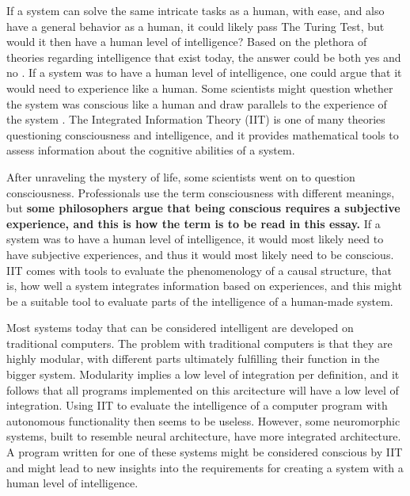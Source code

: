 If a system can solve the same intricate tasks as a human, with ease, and also have a general behavior as a human,
it could likely pass The Turing Test, but would it then have a human level of intelligence?
Based on the plethora of theories regarding intelligence that exist today, the answer could be both yes and no \cite{haenlein_brief_2019}.
If a system was to have a human level of intelligence, one could argue that it would need to experience like a human.
Some scientists might question whether the system was conscious like a human and draw parallels to the experience of the system \cite{tononi_integrated_2016}.
The Integrated Information Theory (IIT) is one of many theories questioning consciousness and intelligence, and it provides mathematical tools
to assess information about the cognitive abilities of a system.

After unraveling the mystery of life, some scientists went on to question consciousness.
Professionals use the term consciousness with different meanings, but \textbf{some philosophers argue that being conscious requires a subjective experience, and this is how the term is to be read in this essay.}
If a system was to have a human level of intelligence, it would most likely need to have subjective experiences, and thus it would most likely need to be conscious.
IIT comes with tools to evaluate the phenomenology of a causal structure, that is,
how well a system integrates information based on experiences, and this might be a suitable tool to evaluate parts of the intelligence of a human-made system.

Most systems today that can be considered intelligent are developed on traditional computers. The problem with traditional computers is that they are highly modular, with different parts ultimately fulfilling their function in the bigger system. Modularity implies a low level of integration per definition, and it follows that all programs implemented on this arcitecture will have a low level of integration.
Using IIT to evaluate the intelligence of a computer program with autonomous functionality then seems to be useless.
However, some neuromorphic systems, built to resemble neural architecture, have more integrated architecture.
A program written for one of these systems might be considered conscious by IIT and might lead to new insights into the requirements for creating a system with a human level of intelligence.

